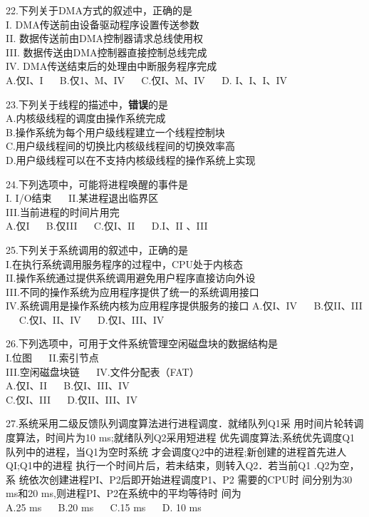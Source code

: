 22.下列关于DMA方式的叙述中，正确的是 \\
I. DMA传送前由设备驱动程序设置传送参数 \\
II. 数据传送前由DMA控制器请求总线使用权 \\
III. 数据传送由DMA控制器直接控制总线完成 \\
IV. DMA传送结束后的处理由中断服务程序完成 \\
A.仅I、I $\quad$ B.仅1、M、IV $\quad$ C.仅I、M、IV $\quad$ D. I、I、I、IV

23.下列关于线程的描述中，\textbf{错误}的是 \\
A.内核级线程的调度由操作系统完成 \\
B.操作系统为每个用户级线程建立一个线程控制块 \\
C.用户级线程间的切换比内核级线程间的切换效率高 \\
D.用户级线程可以在不支持内核级线程的操作系统上实现

24.下列选项中，可能将进程唤醒的事件是 \\
I. I/O结束 $\quad$ II.某进程退出临界区 \\
III.当前进程的时间片用完 \\
A.仅I $\quad$ B.仅III $\quad$ C.仅I、II $\quad$ D.I、II 、III

25.下列关于系统调用的叙述中，正确的是 \\
I.在执行系统调用服务程序的过程中，CPU处于内核态 \\
II.操作系统通过提供系统调用避免用户程序直接访向外设 \\
III.不同的操作系统为应用程序提供了统一的系统调用接口 \\
IV.系统调用是操作系统内核为应用程序提供服务的接口
A.仅I、IV $\quad$ B.仅II、III $\quad$ C.仅I、II、IV $\quad$ D.仅I、III、IV

26.下列选项中，可用于文件系统管理空闲磁盘块的数据结构是 \\
I.位图  $\quad$ II.索引节点 \\
III.空闲磁盘块链 $\quad$ IV.文件分配表（FAT） \\
A.仅I、II $\quad$ B.仅I、III、IV \\
C.仅I、III $\quad$ D.仅II、III、IV

27.系统采用二级反馈队列调度算法进行进程调度．就绪队列Q1采
用时间片轮转调度算法，时间片为10 ms;就绪队列Q2采用短进程
优先调度算法;系统优先调度Q1队列中的进程，当Q1为空时系统
才会调度Q2中的进程;新创建的进程首先进人QI;Q1中的进程
执行一个时间片后，若未结束，则转入Q2．若当前Q1 .Q2为空，系
统依次创建进程PI、P2后即开始进程调度P1、P2 需要的CPU时
间分别为30 ms和20 ms,则进程PI、P2在系统中的平均等待时
间为 \\
A.25 ms $\quad$ B.20 ms $\quad$ C.15 ms $\quad$ D. 10 ms

